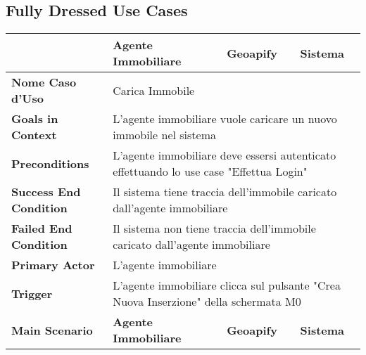         \subsection{Fully Dressed Use Cases}
    \begin{longtable}{|m{4cm}|m{4cm}|m{3cm}|m{4cm}|}
        \endfirsthead
        \hline
         & \textbf{Agente Immobiliare} & \textbf{Geoapify} & \textbf{Sistema} \\
        \hline
        \endhead %
        \hline
        \textbf{Nome Caso d'Uso} & \multicolumn{3}{p{11cm}|}{Carica Immobile} \\
        \hline
        \textbf{Goals in Context}
        & \multicolumn{3}{p{11cm}|}{L'agente immobiliare vuole caricare un nuovo immobile nel sistema} \\
        \hline
        \textbf{Preconditions}
        & \multicolumn{3}{p{11cm}|}{L'agente immobiliare deve essersi autenticato effettuando lo use case "Effettua Login"} \\
        \hline
        \textbf{Success End Condition}
        & \multicolumn{3}{p{11cm}|}{Il sistema tiene traccia dell'immobile caricato dall'agente immobiliare} \\
        \hline
        \textbf{Failed End Condition}
        & \multicolumn{3}{p{11cm}|}{Il sistema non tiene traccia dell'immobile caricato dall'agente immobiliare} \\
        \hline
        \textbf{Primary Actor}
        & \multicolumn{3}{p{11cm}|}{L'agente immobiliare} \\
        \hline
        \textbf{Trigger}
        & \multicolumn{3}{p{11cm}|}{L'agente immobiliare clicca sul pulsante "Crea Nuova Inserzione" della schermata M0} \\
        \hline

        \textbf{Main Scenario} & \textbf{Agente Immobiliare} & \textbf{Geoapify} & \textbf{Sistema} \\


\end{longtable}

